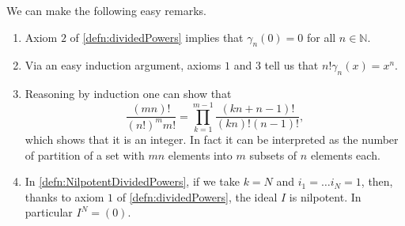 \documentclass[../Main]{subfiles}
\begin{document}
\begin{rem}[]
	We can make the following easy remarks.
\begin{enumerate}
\item Axiom $2$ of \cref{defn:dividedPowers}
	implies that $\gamma_n(0) = 0$ for all $n \in \mathbb{N}$.

\item Via an easy induction argument, axioms $1$ and $3$ tell us that
	$n! \gamma_n(x) = x^n$.

\item Reasoning by induction one can show that
	\begin{equation*}
		\frac{\left( mn \right)!}{\left( n! \right)^m m!} =
		\prod_{k=1}^{m-1} \frac{\left( kn + n - 1 \right)!}{(kn)! (n-1)!}
	,\end{equation*}
	which shows that it is an integer.
	In fact it can be interpreted as the number of partition of a set with $mn$
	elements into $m$ subsets of $n$ elements each.

\item In \cref{defn:NilpotentDividedPowers},
	if we take $k = N$ and $i_1 = \ldots i_N = 1$,
	then, thanks to axiom $1$ of \cref{defn:dividedPowers}, the ideal $I$
	is nilpotent.
	In particular $I^N = (0)$.
\end{enumerate}
\end{rem}
\end{document}
